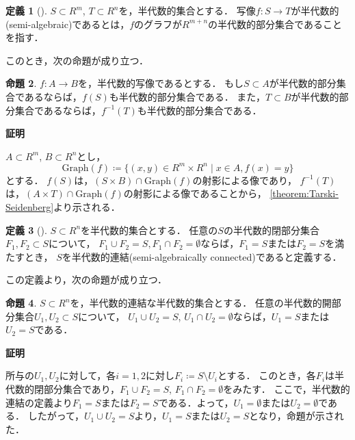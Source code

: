\documentclass[uplatex, dvipdfmx]{jsarticle}
\makeatletter
\numberwithin{equation}{section}
\renewenvironment{proof}[1][\proofname]{\par
  \pushQED{\qed}%
  \normalfont \topsep6\p@\@plus6\p@\relax
  \trivlist
  \item\relax
  {\bfseries
  #1\@addpunct{.}}\hspace\labelsep\ignorespaces
}{
  \popQED\endtrivlist\@endpefalse
}
\newcommand{\map}[3]{{#1}\colon{#2}\rightarrow{#3}}
\theoremstyle{definition}
\newtheorem{definition}{定義}[section]
\newtheorem{proposition}[definition]{命題}
\renewcommand{\proofname}{\textbf{証明}}
\makeatother
\begin{document}
\begin{definition}[{\cite[Definition 2.2.5.]{MR1659509}}]
     $S \subset R^m$, $T \subset R^n$を，半代数的集合とする．
     写像$\map{f}{S}{T}$が半代数的(semi-algebraic)であるとは，$f$のグラフが$R^{m+n}$の半代数的部分集合であることを指す．
\end{definition}

このとき，次の命題が成り立つ．

\begin{proposition}\label{proposition:image-preimage}
     $\map{f}{A}{B}$を，半代数的写像であるとする．
     もし$S \subset A$が半代数的部分集合であるならば，$f(S)$も半代数的部分集合である．
     また，$T \subset B$が半代数的部分集合であるならば，$f^{-1}(T)$も半代数的部分集合である．
\end{proposition}

\begin{proof}
     $A \subset R^m$, $B \subset R^n$とし，
     \begin{equation}
          \mathrm{Graph}(f) \coloneqq \{(x,y) \in R^m \times R^n \mid x \in A, f(x) = y\}
     \end{equation}
     とする．
     $f(S)$は，$(S \times B) \cap \mathrm{Graph}(f)$の射影による像であり，
     $f^{-1}(T)$は，$(A \times T) \cap \mathrm{Graph}(f)$の射影による像であることから，
     \cref{theorem:Tarski-Seidenberg}より示される．
\end{proof}

\begin{definition}[{\cite[Definition 2.4.2.]{MR1659509}}]
     $S \subset R^n$を半代数的集合とする．
     任意の$S$の半代数的閉部分集合$F_1, F_2 \subset S$について，
     $F_1 \cup F_2 = S, F_1 \cap F_2 = \emptyset$ならば，$F_1 = S$または$F_2 = S$を満たすとき，
     $S$を半代数的連結(semi-algebraically connected)であると定義する．
\end{definition}

この定義より，次の命題が成り立つ．

\begin{proposition}\label{proposition:connectedness}
     $S \subset R^n$を，半代数的連結な半代数的集合とする．
     任意の半代数的開部分集合$U_1, U_2 \subset S$について，
     $U_1 \cup U_2 = S$, $U_1 \cap U_2 = \emptyset$ならば，$U_1 = S$または$U_2 = S$である．
\end{proposition}

\begin{proof}
     所与の$U_1, U_2$に対して，各$i=1, 2$に対し$F_i\coloneqq S \setminus U_i$とする．
     このとき，各$F_i$は半代数的閉部分集合であり，$F_1 \cup F_2 = S$, $F_1 \cap F_2 = \emptyset$をみたす．
     ここで，半代数的連結の定義より$F_1 = S$または$F_2 = S$である．よって，$U_1 = \emptyset$または$U_2 = \emptyset$である．
     したがって，$U_1 \cup U_2 = S$より，$U_1 = S$または$U_2 = S$となり，命題が示された．
\end{proof}
\end{document}
